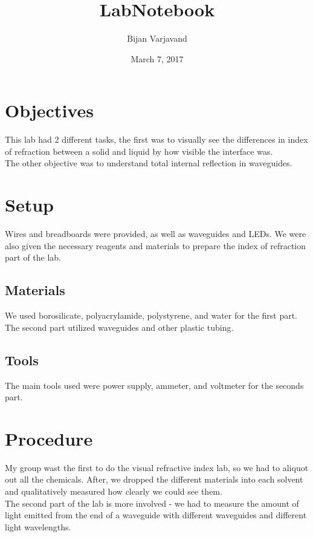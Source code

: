 \documentclass{article}
\author{Bijan Varjavand}
\title{LabNotebook}
\date{March 7, 2017}
\begin{document}
\maketitle

\section{Objectives}

This lab had 2 different tasks, the first was to visually see the differences in index of refraction between a solid and liquid by how visible the interface was.\\
The other objective was to understand total internal reflection in waveguides.

\section{Setup}

Wires and breadboards were provided, as well as waveguides and LEDs. We were also given the necessary reagents and materials to prepare the index of refraction part of the lab.

\subsection{Materials}

We used borosilicate, polyacrylamide, polystyrene, and water for the first part.\\

The second part utilized waveguides and other plastic tubing.

\subsection{Tools}

The main tools used were power supply, ammeter, and voltmeter for the seconds part.

\section{Procedure}

My group wast the first to do the visual refractive index lab, so we had to aliquot out all the chemicals. After, we dropped the different materials into each solvent and qualitatively measured how clearly we could see them.\\

The second part of the lab is more involved - we had to measure the amount of light emitted from the end of a waveguide with different waveguides and different light wavelengths.
\end{document}
